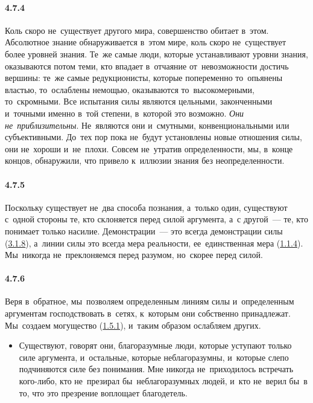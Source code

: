 \paragraph{4.7.4}\hypertarget{par:4.7.4}{} Коль скоро не~существует другого мира, совершенство обитает в~этом. Абсолютное знание обнаруживается в~этом мире, коль скоро не~существует более уровней знания. Те~же самые люди, которые устанавливают уровни знания, оказываются потом теми, кто впадает в~отчаяние от~невозможности достичь вершины: те~же самые редукционисты, которые попеременно то~опьянены властью, то~ослаблены немощью, оказываются то~высокомерными, то~скромными. Все испытания силы являются цельными, законченными и~точными именно в~той степени, в~которой это возможно. {\itshape Они не~приблизительны}. Не~являются они и~смутными, конвенциональными или субъективными. До~тех пор пока не~будут установлены новые отношения силы, они не~хороши и~не~плохи. Совсем не~утратив определенности, мы, в~конце концов, обнаружили, что привело к~иллюзии знания без неопределенности.


\paragraph{4.7.5}\hypertarget{par:4.7.5}{} Поскольку существует не~два способа познания, а~только один, существуют с~одной стороны те, кто склоняется перед силой аргумента, а~с другой~--- те, кто понимает только насилие. Демонстрации~--- это всегда демонстрации силы (\hyperlink{par:3.1.8}{3.1.8}), а~линии силы это всегда мера реальности, ее~единственная мера (\hyperlink{par:1.1.4}{1.1.4}). Мы~никогда не~преклоняемся перед разумом, но~скорее перед силой.


\paragraph{4.7.6}\hypertarget{par:4.7.6}{} Веря в~обратное, мы~позволяем определенным линиям силы и~определенным аргументам господствовать в~сетях, к~которым они собственно принадлежат. Мы~создаем могущество (\hyperlink{par:1.5.1}{1.5.1}), и~таким образом ослабляем других. 
	\begin{itemize}
	\item 
	Существуют, говорят они, благоразумные люди, которые уступают только силе аргумента, и~остальные, которые неблагоразумны, и~которые слепо подчиняются силе без понимания. Мне никогда не~приходилось встречать кого-либо, кто не~презирал бы~неблагоразумных людей, и~кто не~верил бы~в то, что это презрение воплощает благодетель.
	\end{itemize}

